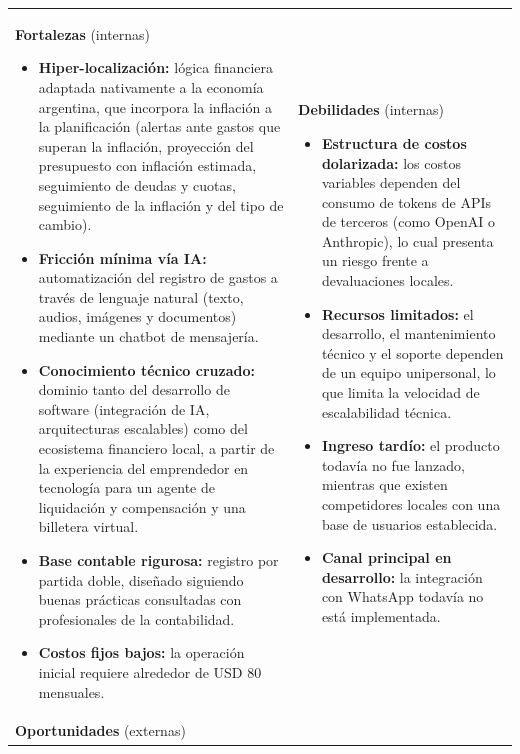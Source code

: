 {\def\LTcaptype{none} %
\begin{longtable}[]{@{}
  >{\raggedright\arraybackslash}p{}
  >{\raggedright\arraybackslash}p{}@{}}
\toprule\noalign{}
\endhead
\bottomrule\noalign{}
\endlastfoot
\begin{minipage}[t]{\linewidth}\raggedright
\textbf{Fortalezas} (internas)

\begin{itemize}
\tightlist
\item
  \textbf{Hiper-localización:} lógica financiera adaptada nativamente a
  la economía argentina, que incorpora la inflación a la planificación
  (alertas ante gastos que superan la inflación, proyección del
  presupuesto con inflación estimada, seguimiento de deudas y cuotas,
  seguimiento de la inflación y del tipo de cambio).
\item
  \textbf{Fricción mínima vía IA:} automatización del registro de gastos
  a través de lenguaje natural (texto, audios, imágenes y documentos)
  mediante un chatbot de mensajería.
\item
  \textbf{Conocimiento técnico cruzado:} dominio tanto del desarrollo de
  software (integración de IA, arquitecturas escalables) como del
  ecosistema financiero local, a partir de la experiencia del
  emprendedor en tecnología para un agente de liquidación y compensación
  y una billetera virtual.
\item
  \textbf{Base contable rigurosa:} registro por partida doble, diseñado
  siguiendo buenas prácticas consultadas con profesionales de la
  contabilidad.
\item
  \textbf{Costos fijos bajos:} la operación inicial requiere alrededor
  de USD 80 mensuales.
\end{itemize}
\end{minipage} & \begin{minipage}[t]{\linewidth}\raggedright
\textbf{Debilidades} (internas)

\begin{itemize}
\tightlist
\item
  \textbf{Estructura de costos dolarizada:} los costos variables
  dependen del consumo de tokens de APIs de terceros (como OpenAI o
  Anthropic), lo cual presenta un riesgo frente a devaluaciones locales.
\item
  \textbf{Recursos limitados:} el desarrollo, el mantenimiento técnico y
  el soporte dependen de un equipo unipersonal, lo que limita la
  velocidad de escalabilidad técnica.
\item
  \textbf{Ingreso tardío:} el producto todavía no fue lanzado, mientras
  que existen competidores locales con una base de usuarios establecida.
\item
  \textbf{Canal principal en desarrollo:} la integración con WhatsApp
  todavía no está implementada.
\end{itemize}
\end{minipage} \\
\begin{minipage}[t]{\linewidth}\raggedright
\textbf{Oportunidades} (externas)


\end{minipage}
\end{longtable}}
